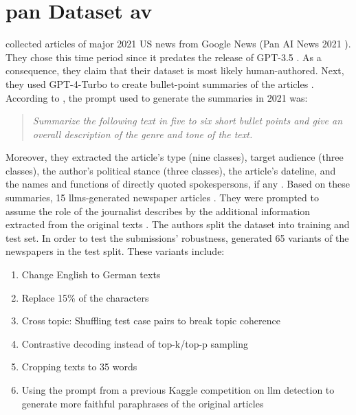 \section{\acs{pan} Dataset \ac{av}}
\label{sec:pan_dataset_authorship_verification}

\citet{ayele_overview_2024,bevendorff_overview_2024} collected articles of major 2021 US news from Google News (Pan AI News 2021 \cite{bevendorff_overview_2024}).
They chose this time period since it predates the release of GPT-3.5 \cite{bevendorff_overview_2024,ayele_overview_2024}.
As a consequence, they claim that their dataset is most likely human-authored.
Next, they used GPT-4-Turbo to create bullet-point summaries of the articles \cite{bevendorff_overview_2024,ayele_overview_2024}. 
According to \citet{bevendorff_overview_2024}, the prompt used to generate the summaries in 2021 was:
\begin{quote}
    \textit{Summarize the following text in five to six short bullet points and give an overall description
    of the genre and tone of the text.}
\end{quote}
Moreover, they extracted the article's type (nine classes), target audience (three classes), the author's political stance (three classes), the article's dateline, 
and the names and functions of directly quoted spokespersons, if any \cite{bevendorff_overview_2024}.
Based on these summaries, 15 \acp{llm}-generated newspaper articles \cite{ayele_overview_2024}.
They were prompted to assume the role of the journalist describes by the additional information extracted from the original texts \cite{bevendorff_overview_2024}.
The authors split the dataset into training and test set.
In order to test the submissions' robustness, \citet{ayele_overview_2024,bevendorff_overview_2024} generated 65 variants of the newspapers in the test split.
These variants include:
\begin{enumerate}
    \item Change English to German texts
    \item Replace 15\% of the characters
    \item Cross topic: Shuffling test case pairs to break topic coherence 
    \item Contrastive decoding instead of top-k/top-p sampling
    \item Cropping texts to 35 words
    \item Using the prompt from a previous Kaggle competition on \ac{llm} detection to generate more faithful paraphrases of the original articles
\end{enumerate}
